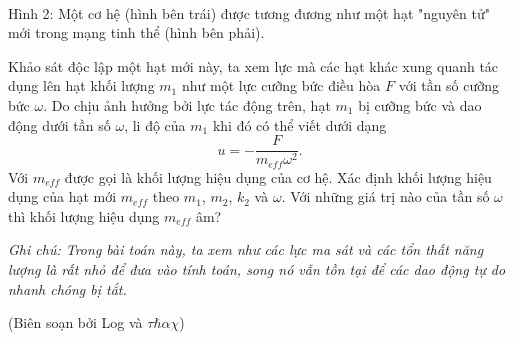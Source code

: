 \begin{enumerate}
\begin{center}
\begin{minipage}{0.4\textwidth}
\centering
{}
\end{minipage}
\begin{minipage}{0.4\textwidth}
\centering
{}
\end{minipage}
\\
\vspace{5mm}
Hình 2: Một cơ hệ (hình bên trái) được tương đương như một hạt "nguyên tử" mới trong mạng tinh thể (hình bên phải).
\label{fig2_negative_mass}
\end{center}

Khảo sát độc lập một hạt mới này, ta xem lực mà các hạt khác xung quanh tác dụng lên hạt khối lượng $m_1$ như một lực cưỡng bức điều hòa $F$ với tần số cưỡng bức $\omega$. Do chịu ảnh hưởng bởi lực tác động trên, hạt $m_1$ bị cưỡng bức và dao động dưới tần số $\omega$, li độ của $m_1$ khi đó có thể viết dưới dạng
$$u = -\dfrac{F}{m_{eff} \omega^2}.$$
Với $m_{eff}$ được gọi là khối lượng hiệu dụng của cơ hệ.
Xác định khối lượng hiệu dụng của hạt mới $m_{eff}$ theo $m_1$, $m_2$, $k_2$ và $\omega$.
Với những giá trị nào của tần số $\omega$ thì khối lượng hiệu dụng $m_{eff}$ âm? 

\end{enumerate}

\textit{Ghi chú: Trong bài toán này, ta xem như các lực ma sát và các tổn thất năng lượng là rất nhỏ để đưa vào tính toán, song nó vẫn tồn tại để các dao động tự do nhanh chóng bị tắt.}

\begin{flushright}
    (Biên soạn bởi Log và $\tau \hbar \alpha \chi$)
\end{flushright}